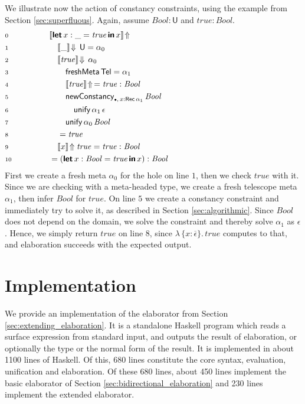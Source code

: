 \documentclass[acmsmall,screen,dvipsnames]{acmart}\settopmatter{}
\newcommand{\slet}{\boldsymbol{\mathsf{let}}}
\renewcommand{\sin}{\boldsymbol{\mathsf{in}}}
\renewcommand{\U}{\mathsf{U}}
\newcommand{\emptycon}{\scaleobj{.75}\bullet}
\newcommand{\unify}{\mathsf{unify}}
\newcommand{\mi}[1]{\mathit{#1}}
\newcommand{\echeckt}[2]{\llbracket#1\rrbracket\!\Downarrow\,#2}
\newcommand{\einfert}[1]{\llbracket#1\rrbracket\!\Uparrow}
\newcommand{\Tel}{\mathsf{Tel}}
\newcommand{\Rec}{\mathsf{Rec}}
\newcommand{\ol}[1]{\overline{#1}}
\theoremstyle{remark}
\begin{document}
\begin{example}
We illustrate now the action of constancy constraints, using the example from
Section \ref{sec:superfluous}. Again, assume $\mi{Bool} : \U$ and $\mi{true} : \mi{Bool}$.
\begin{alignat*}{3}
& \scriptstyle{0}\qquad\qquad && \einfert{\slet\,x : \_ = \mi{true}\,\sin\,x}
      \hspace{21em}\\
& \scriptstyle{1} && \quad \echeckt{\_}{\U} = \alpha_0\\
& \scriptstyle{2} && \quad \echeckt{\mi{true}}{\alpha_0}\\
& \scriptstyle{3} && \qquad \mathsf{freshMeta}\,\Tel = \alpha_1\\
& \scriptstyle{4} && \qquad \einfert{\mi{true}}\,= \mi{true} : \mi{Bool}\\
& \scriptstyle{5} && \qquad \mathsf{newConstancy}_{\emptycon,\,x : \Rec\,\alpha_1}\,\mi{Bool}\\
& \scriptstyle{6} && \qquad\quad \unify\,\alpha_1\,\epsilon\\
& \scriptstyle{7} && \qquad \unify\,\alpha_0\,\mi{Bool}\\
& \scriptstyle{8} && \quad = \mi{true}\\
& \scriptstyle{9} && \quad \einfert{x}{\mi{true}} = \mi{true} : \mi{Bool}\\
& \scriptstyle{10} && = (\slet\,x : \mi{Bool} = \mi{true}\,\sin\,x) : \mi{Bool}
\end{alignat*}
First we create a fresh meta $\alpha_0$ for the hole on line $\scriptstyle{1}$,
then we check $\mi{true}$ with it. Since we are checking with a meta-headed type, we
create a fresh telescope meta $\alpha_1$, then infer $\mi{Bool}$ for
$\mi{true}$. On line $\scriptstyle{5}$ we create a constancy constraint and
immediately try to solve it, as described in Section
\ref{sec:algorithmic}. Since $\mi{Bool}$ does not depend on the domain, we solve
the constraint and thereby solve $\alpha_1$ as $\epsilon$. Hence, we simply
return $\mi{true}$ on line $\scriptstyle{8}$, since $\lambda\,\{x :
\ol{\epsilon}\}.\,\mi{true}$ computes to that, and elaboration succeeds with the
expected output.
\end{example}

\section{Implementation}
\label{sec:impl_and_eval}

We provide an implementation of the elaborator from Section
\ref{sec:extending_elaboration}. It is a standalone Haskell program which reads
a surface expression from standard input, and outputs the result of elaboration,
or optionally the type or the normal form of the result. It is implemented in
about 1100 lines of Haskell. Of this, 680 lines constitute the core syntax,
evaluation, unification and elaboration. Of these 680 lines, about 450 lines
implement the basic elaborator of Section \ref{sec:bidirectional_elaboration}
and 230 lines implement the extended elaborator.
\end{document}
